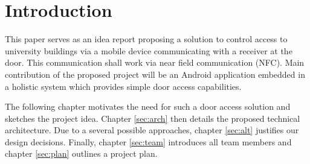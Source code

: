\bigskip
\bigskip


\section{Introduction}

This paper serves as an idea report proposing a solution to control access to university buildings via a mobile device communicating with a receiver at the door. This communication shall work via near field communication (NFC). Main contribution of the proposed project will be an Android application embedded in a holistic system which provides simple door access capabilities.


The following chapter motivates the need for such a door access solution and sketches the project idea. Chapter \ref{sec:arch} then details the proposed technical architecture. Due to a several possible approaches, chapter \ref{sec:alt} justifies our design decisions. Finally, chapter \ref{sec:team} introduces all team members and chapter \ref{sec:plan} outlines a project plan.